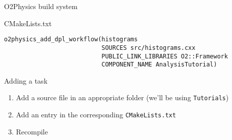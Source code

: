 \documentclass[10pt,lualatex,xcolor={table,svgnames},{hyperref={bookmarks=true,linktoc=all}},aspectratio=169]{beamer}
\begin{document}
   \begin{frame}[fragile]{O2Physics build system}
   \begin{block}{CMakeLists.txt}
       \begin{verbatim}
o2physics_add_dpl_workflow(histograms
                           SOURCES src/histograms.cxx
                           PUBLIC_LINK_LIBRARIES O2::Framework
                           COMPONENT_NAME AnalysisTutorial)
       \end{verbatim}
   \end{block}
    \begin{block}{Adding a task}
        \begin{enumerate}
            \item Add a source file in an appropriate folder (we'll be using \verb|Tutorials|)
            \item Add an entry in the corresponding \verb|CMakeLists.txt|
            \item Recompile
        \end{enumerate}
    \end{block}
   \end{frame}
\end{document}
